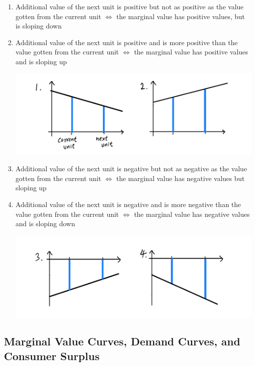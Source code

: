 \documentclass{article}
\begin{document}
  \begin{enumerate}
      \item Additional value of the next unit is positive but not as positive as the value gotten from the current unit $\iff$ the marginal value has positive values, but is sloping down
      \item Additional value of the next unit is positive and is more positive than the value gotten from the current unit $\iff$ the marginal value has positive values and is sloping up
      \begin{center}
          \includegraphics[scale=0.25]{img/12.PNG}
      \end{center}
      \item Additional value of the next unit is negative but not as negative as the value gotten from the current unit $\iff$ the marginal value has negative values but sloping up
      \item Additional value of the next unit is negative and is more negative than the value gotten from the current unit $\iff$ the marginal value has negative values and is sloping down
      \begin{center}
          \includegraphics[scale=0.25]{img/34.PNG}
      \end{center}
  \end{enumerate}

  \subsection{Marginal Value Curves, Demand Curves, and Consumer Surplus}
\end{document}
